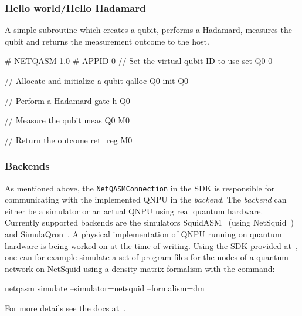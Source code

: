 \subsubsection{Hello world/Hello Hadamard}\label{sec:example_nq_hello_world}
A simple subroutine which creates a qubit, performs a Hadamard, measures the qubit and returns the measurement outcome to the host.
\begin{nqcode}
  # NETQASM 1.0
  # APPID 0
  // Set the virtual qubit ID to use
  set Q0 0

  // Allocate and initialize a qubit
  qalloc Q0
  init Q0

  // Perform a Hadamard gate
  h Q0

  // Measure the qubit
  meas Q0 M0

  // Return the outcome
  ret_reg M0
\end{nqcode}

\subsubsection{Backends}
\label{sec:backends}
As mentioned above, the \texttt{NetQASMConnection} in the SDK is responsible for communicating with the implemented \ac{QNPU} in the \emph{backend}.
The \emph{backend} can either be a simulator or an actual \ac{QNPU} using real quantum hardware.
Currently supported backends are the simulators SquidASM~\cite{git_squidasm} (using NetSquid~\cite{netsquid, coopmans2021netsquid}) and SimulaQron~\cite{dahlberg2018simulaqron}.
A physical implementation of \ac{QNPU} running on quantum hardware is being worked on at the time of writing.
Using the SDK provided at~\cite{git_netqasm}, one can for example simulate a set of program files for the nodes of a quantum network on NetSquid using a density matrix formalism with the command:
\begin{nqcode}
  netqasm simulate --simulator=netsquid --formalism=dm
\end{nqcode}
For more details see the docs at~\cite{git_netqasm}.